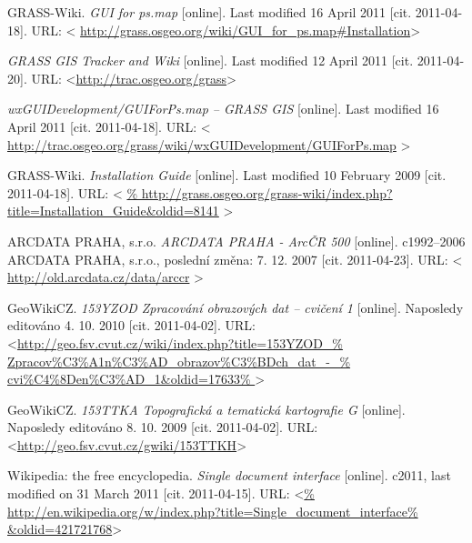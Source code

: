 \documentclass[a4paper,12pt,draft]{article}
\begin{document}
\begin{thebibliography}{99}
GRASS-Wiki. \textit{GUI for ps.map} [online]. Last modified
16 April 2011 [cit. 2011-04-18]. URL: \textless
\url{http://grass.osgeo.org/wiki/GUI_for_ps.map\#Installation}\textgreater


\textit{GRASS GIS Tracker and Wiki} [online]. Last modified 12 April 2011
[cit. 2011-04-20].
URL: \textless\url{http://trac.osgeo.org/grass}\textgreater


\textit{wxGUIDevelopment/GUIForPs.map -- GRASS GIS} [online]. Last modified
16 April 2011 [cit. 2011-04-18]. URL: \textless
\url{http://trac.osgeo.org/grass/wiki/wxGUIDevelopment/GUIForPs.map}
\textgreater


GRASS-Wiki. \textit{Installation Guide} [online]. Last modified
10 February 2009 [cit. 2011-04-18]. URL: \textless
\url{%
http://grass.osgeo.org/grass-wiki/index.php?title=Installation_Guide&oldid=8141}
\textgreater



ARCDATA PRAHA, s.r.o. \textit{ARCDATA PRAHA - ArcČR 500} [online].
c1992–2006 ARCDATA PRAHA, s.r.o., poslední změna: 7. 12. 2007 [cit. 2011-04-23].
URL: \textless
\url{http://old.arcdata.cz/data/arccr} \textgreater



GeoWikiCZ. \textit{153YZOD Zpracování obrazových dat -- cvičení 1} [online].
Naposledy editováno 4. 10. 2010 [cit. 2011-04-02].
URL: \textless\url{http://geo.fsv.cvut.cz/wiki/index.php?title=153YZOD_%
Zpracov\%C3\%A1n\%C3\%AD_obrazov\%C3\%BDch_dat_-_%
cvi\%C4\%8Den\%C3\%AD_1&oldid=17633%
}\textgreater



GeoWikiCZ. \textit{153TTKA Topografická a tematická kartografie G} [online].
Naposledy editováno 8. 10. 2009 [cit. 2011-04-02].
URL: \textless\url{http://geo.fsv.cvut.cz/gwiki/153TTKH}\textgreater


Wikipedia: the free encyclopedia. \textit{Single document interface}
[online]. c2011, last modified on 31 March 2011 [cit. 2011-04-15]. URL: 
\textless\url{%
http://en.wikipedia.org/w/index.php?title=Single_document_interface%
&oldid=421721768}\textgreater


\end{thebibliography}
\end{document}
